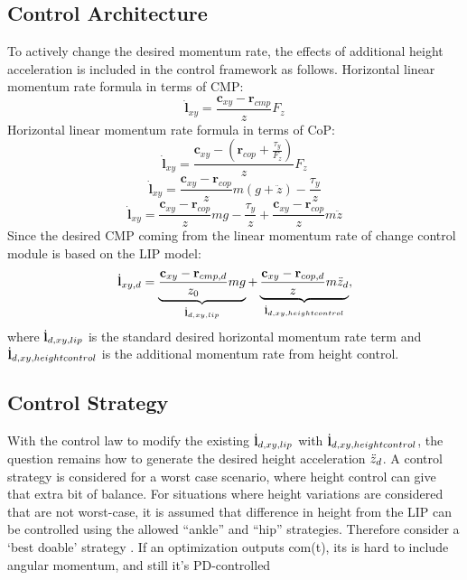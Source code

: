 \subsection{Control Architecture}
To actively change the desired momentum rate, the effects of additional height acceleration is included in the control framework as follows. 
Horizontal linear momentum rate formula in terms of \ac{CMP}:
\begin{equation}
\dot{\mathbf{l}}_{xy}=\frac{\mathbf{c}_{xy}-\mathbf{r}_{cmp}}{z}F_z
\end{equation}
Horizontal linear momentum rate formula in terms of \ac{CoP}:
\begin{equation}
\dot{\mathbf{l}}_{xy}=\frac{\mathbf{c}_{xy}-(\mathbf{r}_{cop}+\frac{\tau_y}{F_z})}{z}F_z
\end{equation}
\begin{equation}
\dot{\mathbf{l}}_{xy}=\frac{\mathbf{c}_{xy}-\mathbf{r}_{cop}}{z}m(g+\ddot{z}) - \frac{\tau_y}{z}
\end{equation}
\begin{equation}
\dot{\mathbf{l}}_{xy}=\frac{\mathbf{c}_{xy}-\mathbf{r}_{cop}}{z}mg - \frac{\tau_y}{z} + \frac{\mathbf{c}_{xy}-\mathbf{r}_{cop}}{z}m\ddot{z}
\end{equation}
 Since the desired \ac{CMP} coming from the linear momentum rate of change control module is based on the \ac{LIP} model:
 \begin{equation}
\dot{\mathbf{l}}_{xy,d}=\underbrace{ \frac{\mathbf{c}_{xy}-\mathbf{r}_{cmp,d}} {z_0}mg}_{\dot{\mathbf{l}}_{d,xy,lip}}  + \underbrace{\frac{\mathbf{c}_{xy}-\mathbf{r}_{cop,d}}{z}m\ddot{z}_d}_{\dot{\mathbf{l}}_{d,xy,heightcontrol}},
\end{equation}
where $\dot{\mathbf{l}}_{d,xy,lip}$ is the standard desired horizontal momentum rate term and $\dot{\mathbf{l}}_{d,xy,heightcontrol}$ is the additional momentum rate from height control.

\subsection{Control Strategy}
With the control law to modify the existing $\dot{\mathbf{l}}_{d,xy,lip}$ with $\dot{\mathbf{l}}_{d,xy,heightcontrol}$, the question remains how to generate the desired height acceleration $\ddot{z}_d$. A control strategy is considered for a worst case scenario, where height control can give that extra bit of balance. For situations where height variations are considered that are not worst-case, it is assumed that difference in height from the \ac{LIP} can be controlled using the allowed ``ankle'' and ``hip'' strategies. Therefore consider a `best doable' strategy . If an optimization outputs com(t), its is hard to include angular momentum, and still it's PD-controlled 

